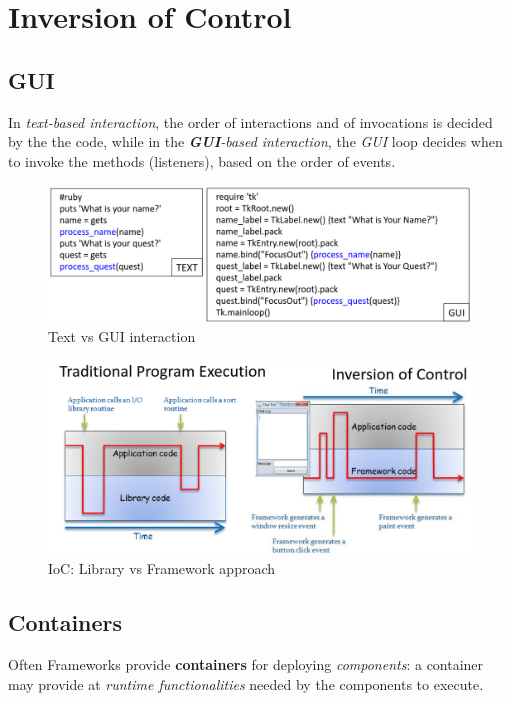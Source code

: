 \section{Inversion of Control}
\subsection{GUI}
In \textit{text-based interaction}, the order of interactions
and of invocations is decided by the the code,
while in the \textit{\textbf{GUI}-based interaction}, the \textit{GUI} loop decides
when to invoke the methods (listeners), based on the
order of events.

\begin{figure}[htbp]
   \centering
   \includegraphics{images/ioc_textgui.png}
   \caption{Text vs GUI interaction}
   \label{fig:ioc_textgui}
\end{figure}

\begin{figure}[htbp]
   \centering
   \includegraphics{images/ioc_fwvslib.png}
   \caption{IoC: Library vs Framework approach}
   \label{fig:ioc_fwvslib}
\end{figure}

\subsection{Containers}
Often Frameworks provide \textbf{containers} for deploying
\textit{components}:
a container may provide at \textit{runtime functionalities}
needed by the components to execute.


